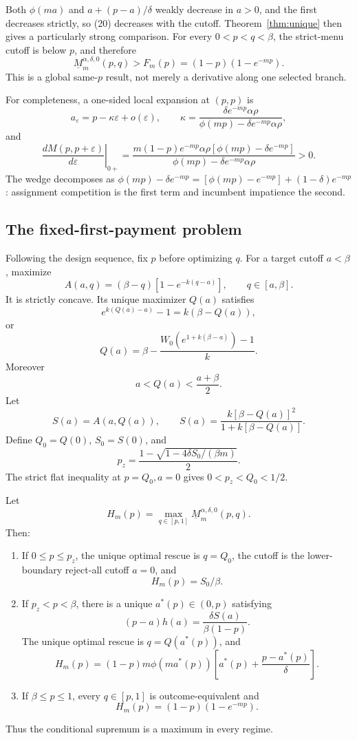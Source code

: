 \documentclass[mnsc,dblanonrev]{informs4}
\newcommand{\ph}{\phi}
\begin{document}
Both $\ph(ma)$ and $a+(p-a)/\delta$ weakly decrease in $a>0$, and the
first decreases strictly, so (20) decreases with the cutoff.
Theorem~\ref{thm:unique} then gives a particularly strong comparison.  For
every $0<p<q<\beta$, the strict-menu cutoff is below $p$, and therefore
\[
 \underline M_m^{\alpha,\delta,0}(p,q)>F_m(p)
 =(1-p)(1-e^{-mp}).                                         \tag{22}
\]
This is a global same-$p$ result, not merely a derivative along one selected
branch.

For completeness, a one-sided local expansion at $(p,p)$ is
\[
 a_\varepsilon=p-\kappa\varepsilon+o(\varepsilon),
 \qquad
 \kappa=
 \frac{\delta e^{-mp}\alpha\rho}
 {\ph(mp)-\delta e^{-mp}\alpha\rho},                       \tag{23}
\]
and
\[
 \left.\frac{dM(p,p+\varepsilon)}{d\varepsilon}\right|_{0+}
 =\frac{m(1-p)e^{-mp}\alpha\rho
 [\ph(mp)-\delta e^{-mp}]}
 {\ph(mp)-\delta e^{-mp}\alpha\rho}>0.                    \tag{24}
\]
The wedge decomposes as
$\ph(mp)-\delta e^{-mp}=[\ph(mp)-e^{-mp}]+(1-\delta)e^{-mp}$:
assignment competition is the first term and incumbent impatience the second.

\subsection{The fixed-first-payment problem}

Following the design sequence, fix $p$ before optimizing $q$.  For a target
cutoff $a<\beta$, maximize
\[
 A(a,q)=(\beta-q)[1-e^{-k(q-a)}],\qquad q\in[a,\beta].       \tag{25}
\]
It is strictly concave.  Its unique maximizer $Q(a)$ satisfies
\[
 e^{k(Q(a)-a)}-1=k(\beta-Q(a)),                              \tag{26}
\]
or
\[
 Q(a)=\beta-
 \frac{W_0(e^{1+k(\beta-a)})-1}{k}.                         \tag{27}
\]
Moreover
\[
 a<Q(a)<\frac{a+\beta}{2}.
\]
Let
\[
 S(a)=A(a,Q(a)),\qquad
 S(a)=\frac{k[\beta-Q(a)]^2}{1+k[\beta-Q(a)]}.              \tag{28}
\]
Define $Q_0=Q(0)$, $S_0=S(0)$, and
\[
 p_z=\frac{1-\sqrt{1-4\delta S_0/(\beta m)}}2.             \tag{29}
\]
The strict flat inequality at $p=Q_0,a=0$ gives
$0<p_z<Q_0<1/2$.

\begin{theorem}
\label{thm:fixedp}
Let
\[
 H_m(p)=\max_{q\in[p,1]}\underline M_m^{\alpha,\delta,0}(p,q).
\]
Then:
\begin{enumerate}[label=(\roman*)]
 \item If $0\le p\le p_z$, the unique optimal rescue is $q=Q_0$, the
 cutoff is the lower-boundary reject-all cutoff $a=0$, and
 \[
 H_m(p)=S_0/\beta.
 \]
 \item If $p_z<p<\beta$, there is a unique $a^*(p)\in(0,p)$ satisfying
 \[
 (p-a)h(a)=\frac{\delta S(a)}{\beta(1-p)}.                  \tag{30}
 \]
 The unique optimal rescue is $q=Q(a^*(p))$, and
 \[
 H_m(p)=(1-p)m\ph(ma^*(p))
 \left[a^*(p)+\frac{p-a^*(p)}\delta\right].
 \]
 \item If $\beta\le p\le1$, every $q\in[p,1]$ is outcome-equivalent and
 \[
 H_m(p)=(1-p)(1-e^{-mp}).
 \]
\end{enumerate}
Thus the conditional supremum is a maximum in every regime.
\end{theorem}
\end{document}
